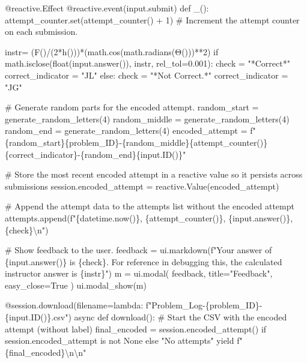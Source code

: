 \documentclass[
  letterpaper,
  DIV=11,
  numbers=noendperiod]{scrreprt}
\newenvironment{Shaded}{\begin{snugshade}}{\end{snugshade}}
\newcommand{\NormalTok}[1]{\textcolor[rgb]{0.00,0.23,0.31}{#1}}
\begin{document}
\begin{Shaded}
\begin{Highlighting}[]
\NormalTok{    @reactive.Effect}
\NormalTok{    @reactive.event(input.submit)}
\NormalTok{    def \_():}
\NormalTok{        attempt\_counter.set(attempt\_counter() + 1)  \# Increment the attempt counter on each submission.}
        
\NormalTok{        instr= (F()/(2*h()))*(math.cos(math.radians(Θ()))**2)}
\NormalTok{        if math.isclose(float(input.answer()), instr, rel\_tol=0.001):}
\NormalTok{            check = "*Correct*"}
\NormalTok{            correct\_indicator = "JL"}
\NormalTok{        else:}
\NormalTok{            check = "*Not Correct.*"}
\NormalTok{            correct\_indicator = "JG"}

\NormalTok{        \# Generate random parts for the encoded attempt.}
\NormalTok{        random\_start = generate\_random\_letters(4)}
\NormalTok{        random\_middle = generate\_random\_letters(4)}
\NormalTok{        random\_end = generate\_random\_letters(4)}
\NormalTok{        encoded\_attempt = f"\{random\_start\}\{problem\_ID\}{-}\{random\_middle\}\{attempt\_counter()\}\{correct\_indicator\}{-}\{random\_end\}\{input.ID()\}"}

\NormalTok{        \# Store the most recent encoded attempt in a reactive value so it persists across submissions}
\NormalTok{        session.encoded\_attempt = reactive.Value(encoded\_attempt)}

\NormalTok{        \# Append the attempt data to the attempts list without the encoded attempt}
\NormalTok{        attempts.append(f"\{datetime.now()\}, \{attempt\_counter()\}, \{input.answer()\}, \{check\}\textbackslash{}n")}

\NormalTok{        \# Show feedback to the user.}
\NormalTok{        feedback = ui.markdown(f"Your answer of \{input.answer()\} is \{check\}. For reference in debugging this, the calculated instructor answer is \{instr\}")}
\NormalTok{        m = ui.modal(}
\NormalTok{            feedback,}
\NormalTok{            title="Feedback",}
\NormalTok{            easy\_close=True}
\NormalTok{        )}
\NormalTok{        ui.modal\_show(m)}

\NormalTok{    @session.download(filename=lambda: f"Problem\_Log{-}\{problem\_ID\}{-}\{input.ID()\}.csv")}
\NormalTok{    async def download():}
\NormalTok{        \# Start the CSV with the encoded attempt (without label)}
\NormalTok{        final\_encoded = session.encoded\_attempt() if session.encoded\_attempt is not None else "No attempts"}
\NormalTok{        yield f"\{final\_encoded\}\textbackslash{}n\textbackslash{}n"}
        

\end{Highlighting}
\end{Shaded}
\end{document}
